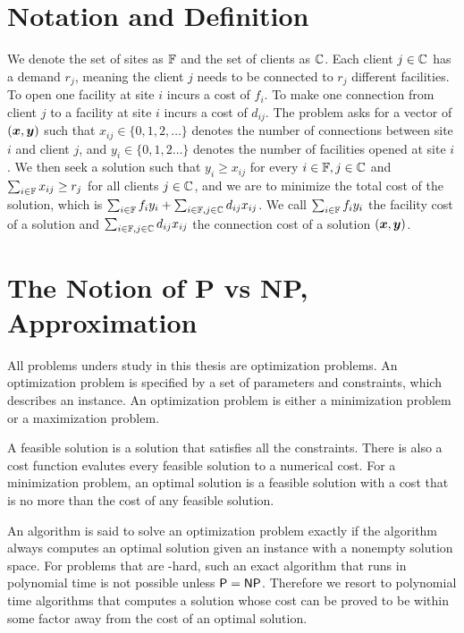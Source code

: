 \documentclass[oneside,final]{ucr}
\begin{document}
\section{Notation and Definition}
We denote the set of sites as $\mathbb{F}$ and the set of clients as
$\mathbb{C}$. Each client $j \in \mathbb{C}$ has a demand $r_j$,
meaning the client $j$ needs to be connected to $r_j$ different
facilities. To open one facility at site $i$ incurs a cost of
$f_i$. To make one connection from client $j$ to a facility at site
$i$ incurs a cost of $d_{ij}$. The problem asks for a vector of
$(\boldsymbol{x}, \boldsymbol{y})$ such that $x_{ij} \in \{0, 1, 2, \ldots\}$ denotes the
number of connections between site $i$ and client $j$, and $y_i \in
\{0, 1, 2\ldots\}$ denotes the number of facilities opened at site
$i$. We then seek a solution such that $y_i \geq x_{ij}$ for every $i
\in \mathbb{F}, j \in \mathbb{C}$ and $\sum_{i\in\mathbb{F}} x_{ij} \geq
r_j$ for all clients $j \in \mathbb{C}$, and we are to minimize the
total cost of the solution, which is $\sum_{i \in \mathbb{F}} f_i y_i +
\sum_{i \in \mathbb{F}, j \in \mathbb{C}} d_{ij} x_{ij}$. We call
$\sum_{i \in \mathbb{F}} f_i y_i$ the facility cost of a solution and
$\sum_{i \in \mathbb{F}, j \in \mathbb{C}} d_{ij} x_{ij}$ the
connection cost of a solution $(\boldsymbol{x}, \boldsymbol{y})$.

\section{The Notion of P vs NP, Approximation}
All problems unders study in this thesis are optimization problems. An
optimization problem is specified by a set of parameters and
constraints, which describes an instance. An optimization problem is
either a minimization problem or a maximization problem.

A feasible solution is a solution that satisfies all the
constraints. There is also a cost function evalutes every feasible
solution to a numerical cost. For a minimization problem, an optimal
solution is a feasible solution with a cost that is no more than the
cost of any feasible solution.

An algorithm is said to solve an optimization problem exactly if the
algorithm always computes an optimal solution given an instance with a
nonempty solution space. For problems that are \NP-hard, such an exact
algorithm that runs in polynomial time is not possible unless ${\mbox{\sf P}} =
{\mbox{\sf NP}}$. Therefore we resort to polynomial time algorithms that computes
a solution whose cost can be proved to be within some factor away from
the cost of an optimal solution.
\end{document}

